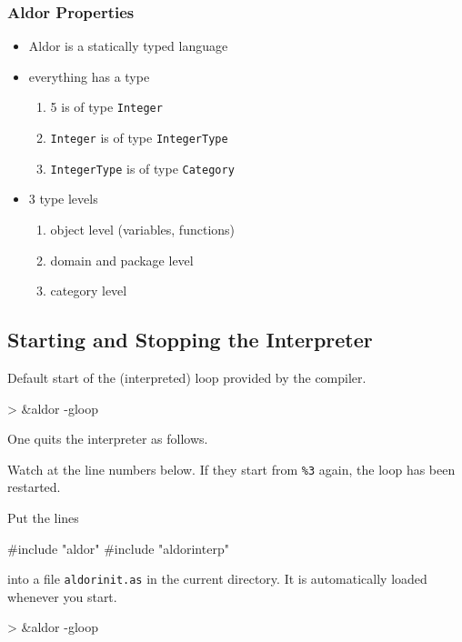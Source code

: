 \begin{frame}[fragile]
  \frametitle{Aldor Properties}

  \begin{itemize}
  \item Aldor is a statically typed language
  \item everything has a type
    \begin{enumerate}
    \item 5 is of type \texttt{Integer}
    \item \texttt{Integer} is of type \texttt{IntegerType}
    \item \texttt{IntegerType} is of type \texttt{Category}
    \end{enumerate}
  \item 3 type levels
    \begin{enumerate}
    \item object level (variables, functions)
    \item domain and package level
    \item category level
    \end{enumerate}
  \end{itemize}
\end{frame}



\subsection{Starting and Stopping the Interpreter}

Default start of the (interpreted) loop provided by the compiler.
\begin{myverbatim}
> &aldor -gloop
\end{myverbatim}
%
One quits the interpreter as follows.
\begin{myverbatim}
\end{myverbatim}

Watch at the line numbers below. If they start from \verb'%3' again,
the loop has been restarted.

Put the lines
\begin{myverbatim}
#include "aldor"
#include "aldorinterp"
\end{myverbatim}
into a file \texttt{aldorinit.as} in the current directory. It is
automatically loaded whenever you start.
\begin{myverbatim}
> &aldor -gloop
\end{myverbatim}






